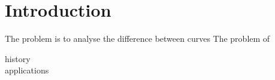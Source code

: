 
\section{Introduction}
The problem is to analyse the difference between curves
The problem of

history \\
applications  \\

